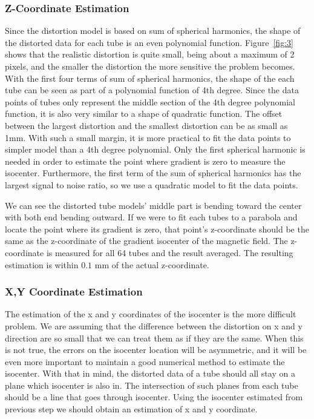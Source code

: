\subsubsection{Z-Coordinate Estimation}

Since the distortion model is based on sum of spherical harmonics, the shape of the distorted data for each tube is an even polynomial function. Figure~\ref{fig:3} shows that the realistic distortion is quite small, being about a maximum of 2 pixels, and the smaller the distortion the more sensitive the problem becomes.  With the first four terms of sum of spherical harmonics, the shape of the each tube can be seen as part of a polynomial function of 4th degree. Since the data points of tubes only represent the middle section of the 4th degree polynomial function, it is also very similar to a shape of quadratic function.  The offset between the largest distortion and the smallest distortion can be as small as 1mm.  With such a small margin, it is more practical to fit the data points to simpler model than a 4th degree polynomial.  Only the first spherical harmonic is needed in order to estimate the point where gradient is zero to measure the isocenter.  Furthermore, the first term of the sum of spherical harmonics has the largest signal to noise ratio, so we use a quadratic model to fit the data points.

We can see the distorted tube models' middle part is bending toward the center with both end bending outward.
If we were to fit each tubes to a parabola and locate the point where its gradient is zero, that point's
z-coordinate should be the same as the z-coordinate of the gradient isocenter of the magnetic field.  The z-coordinate is measured for all 64 tubes and the result averaged.  The resulting estimation is within $0.1$ mm of the actual z-coordinate.

\subsubsection{X,Y Coordinate Estimation}

The estimation of the x and y coordinates of the isocenter is the more difficult problem.
We are assuming that the difference between the distortion on x and y direction are so small that we can
treat them as if they are the same.  When this is not true, the errors on the isocenter location will be asymmetric, and it will be even more important to maintain a good numerical method to estimate the isocenter.  With that in mind, the distorted data of a tube should all stay on a plane which isocenter is also in. The intersection of such planes from each tube should be a line that
goes through isocenter. Using the isocenter estimated from previous step we should obtain an estimation
of x and y coordinate.

